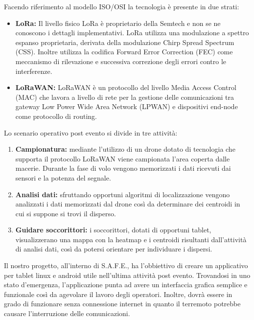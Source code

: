 \documentclass[a4paper]{report}
\begin{document}
Facendo riferimento al modello ISO/OSI la tecnologia è presente in due strati: 
\begin{itemize}
    \item \textbf{LoRa: } Il livello fisico LoRa è proprietario della Semtech e non se ne conoscono i dettagli implementativi.
    LoRa utilizza una modulazione a spettro espanso proprietaria, derivata della modulazione Chirp Spread Spectrum (CSS). Inoltre utilizza la codifica Forward Error Correction (FEC) come meccanismo di rilevazione e successiva correzione degli errori contro le interferenze. 
    \item \textbf{LoRaWAN: } LoRaWAN è un protocollo del livello Media Access Control (MAC) che lavora a livello di rete per la gestione delle comunicazioni tra gateway Low Power Wide Area Network (LPWAN) e dispositivi end-node come protocollo di routing.
    \end{itemize} 
Lo scenario operativo post evento si divide in tre attività:
\begin{enumerate}[label=\roman{*}., ref=(\roman{*})]
    \item \textbf{Campionatura:} mediante l'utilizzo di un drone dotato di tecnologia che supporta il protocollo LoRaWAN viene campionata l'area coperta dalle macerie. Durante la fase di volo vengono memorizzati i dati ricevuti dai sensori e la potenza del segnale.
    \item \textbf{Analisi dati:} sfruttando opportuni algoritmi di localizzazione vengono analizzati i dati memorizzati dal drone così da determinare dei centroidi in cui si suppone si trovi il disperso. 
    \item \textbf{Guidare soccorittori:} i soccorittori, dotati di opportuni tablet, visualizzerano una mappa con la heatmap e i centroidi risultanti dall'attività di analisi dati, così da potersi orientare per individuare i dispersi.
    \end{enumerate}

Il nostro progetto, all'interno di S.A.F.E.,  ha l'obbiettivo di creare un applicativo per tablet linux e android utile nell'ultima attività post evento.\newline 
Trovandosi in uno stato d'emergenza, l'applicazione punta ad avere un interfaccia grafica semplice e funzionale così da agevolare il lavoro degli operatori. Inoltre, dovrà essere in grado di funzionare senza connessione internet in quanto il terremoto potrebbe causare l'interruzione delle comunicazioni.

\end{document}
